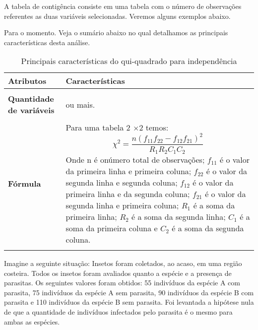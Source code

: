 \documentclass[14pt,titlepage, oneside, openany, a4paper]{book}
\begin{document}
A tabela de contigência consiste em uma tabela com o número de observações referentes as duas variáveis selecionadas. Veremos alguns exemplos abaixo.

Para o momento. Veja o sumário abaixo no qual detalhamos as principais características desta análise.

\begin{table}

\caption{\label{tab:tab2qui}Principais características do qui-quadrado para independência}
\centering
\begin{tabular}[c]{>{\raggedright\arraybackslash}p{10em}>{\raggedright\arraybackslash}p{30em}}
\toprule
Atributos & Características\\
\midrule
\textbf{\cellcolor{gray!6}{Tipo de variável}} & \cellcolor{gray!6}{Categórica.}\\
\textbf{Quantidade de variáveis} & 2 ou mais.\\
\textbf{\cellcolor{gray!6}{Hipótese nula}} & \cellcolor{gray!6}{As proporções relativas de uma variável são independentes de uma segunda variável.}\\
\textbf{Fórmula} & Para uma tabela 2 $\times$2 temos: $$\chi^{2} = \frac{n(f_{11}f_{22}-f_{12}f_{21})^2}{R_{1}R_{2}C_{1}C_{2}}$$ Onde n é onúmero total de observações; $f_{11}$ é o valor da primeira linha e primeira coluna; $f_{22}$ é o valor da segunda linha e segunda coluna; $f_{12}$ é o valor da primeira linha e da segunda coluna; $f_{21}$ é o valor da segunda linha e primeira coluna; $R_{1}$ é a soma da primeira linha; $R_{2}$ é a soma da segunda linha; $C_{1}$ é a soma da primeira coluna e $C_{2}$ é a soma da segunda coluna.\\
\textbf{\cellcolor{gray!6}{Observação}} & \cellcolor{gray!6}{Como característica intrinseca a este teste é necessário a construção da tabela de contigência.}\\
\bottomrule
\end{tabular}
\end{table}

Imagine a seguinte situação: Insetos foram coletados, ao acaso, em uma região costeira. Todos os insetos foram avaliados quanto a espécie e a presença de parasitas. Os seguintes valores foram obtidos: 55 indivíduos da espécie A com parasita, 75 indivíduos da espécie A sem parasita, 90 indivíduos da espécie B com parasita e 110 indivíduos da espécie B sem parasita. Foi levantada a hipótese nula de que a quantidade de indivíduos infectados pelo parasita é o mesmo para ambas as espécies.
\end{document}
